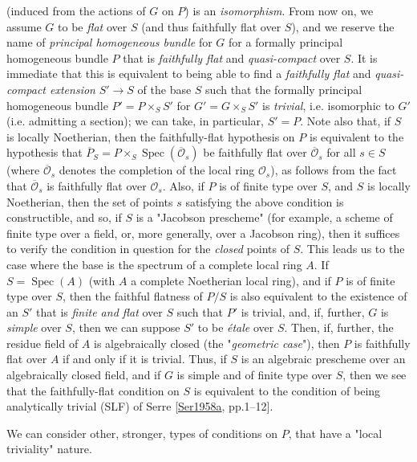   (induced from the actions of \(G\) on \(P\)) is an \emph{isomorphism}.
  From now on, we assume \(G\) to be \emph{flat} over \(S\) (and thus faithfully flat over \(S\)), and we reserve the name of \emph{principal homogeneous bundle} for \(G\) for a formally principal homogeneous bundle \(P\) that is \emph{faithfully flat} and \emph{quasi-compact} over \(S\).
  It is immediate that this is equivalent to being able to find a \emph{faithfully flat} and \emph{quasi-compact extension} \(S'\to  S\) of the base \(S\) such that the formally principal homogeneous bundle \(P'=P\times _S S'\) for \(G'=G\times _S S'\) is \emph{trivial}, i.e. isomorphic to \(G'\) (i.e. admitting a section);
  we can take, in particular, \(S'=P\).
  Note also that, if \(S\) is locally Noetherian, then the faithfully-flat hypothesis on \(P\) is equivalent to the hypothesis that \(\overline {P}_S=P\times _S\operatorname {Spec}(\overline {\mathscr {O}}_s)\) be faithfully flat over \(\overline {\mathscr {O}}_s\) for all \(s\in  S\) (where \(\overline {\mathscr {O}}_s\) denotes the completion of the local ring \(\mathscr {O}_s\)), as follows from the fact that \(\overline {\mathscr {O}}_s\) is faithfully flat over \(\mathscr {O}_s\).
  Also, if \(P\) is of finite type over \(S\), and \(S\) is locally Noetherian, then the set of points \(s\) satisfying the above condition is constructible, and so, if \(S\) is a "Jacobson prescheme" (for example, a scheme of finite type over a field, or, more generally, over a Jacobson ring), then it suffices to verify the condition in question for the \emph{closed} points of \(S\).
  This leads us to the case where the base is the spectrum of a complete local ring \(A\).
  If \(S=\operatorname {Spec}(A)\) (with \(A\) a complete Noetherian local ring), and if \(P\) is of finite type over \(S\), then the faithful flatness of \(P/S\) is also equivalent to the existence of an \(S'\) that is \emph{finite and flat} over \(S\) such that \(P'\) is trivial, and, if, further, \(G\) is \emph{simple} over \(S\), then we can suppose \(S'\) to be \emph{étale} over \(S\).
  Then, if, further, the residue field of \(A\) is algebraically closed (the "\emph{geometric case}"), then \(P\) is faithfully flat over \(A\) if and only if it is trivial.
  Thus, if \(S\) is an algebraic prescheme over an algebraically closed field, and if \(G\) is simple and of finite type over \(S\), then we see that the faithfully-flat condition on \(S\) is equivalent to the condition of being analytically trivial (SLF) of Serre [\hyperref[Ser1958a]{Ser1958a}, pp.1–12].\par{}We can consider other, stronger, types of conditions on \(P\), that have a "local triviality" nature.
